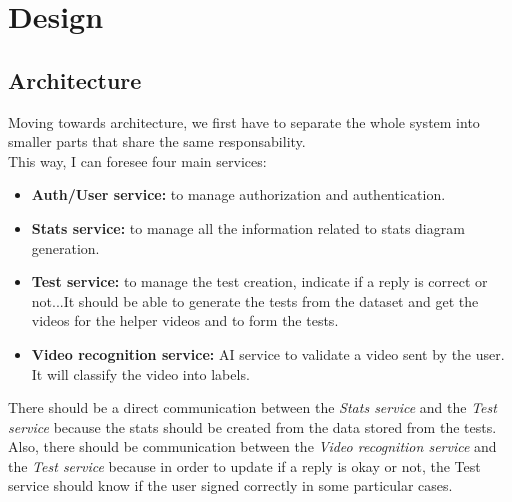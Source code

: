 \chapter{Design}

\section{Architecture}
Moving towards architecture, we first have to separate the whole system into smaller parts that share the same responsability. \\
This way, I can foresee four main services:
\begin{itemize}
    \item \textbf{Auth/User service:} to manage authorization and authentication.
    \item \textbf{Stats service:} to manage all the information related to stats diagram generation. 
    \item \textbf{Test service:} to manage the test creation, indicate if a reply is correct or not...It should be able to generate the tests from the dataset and get the videos for the helper videos and to form the tests.
    \item \textbf{Video recognition service:} AI service to validate a video sent by the user. It will classify the video into labels.
\end{itemize}

There should be a direct communication between the \textit{Stats service} and the \textit{Test service} because the stats should be created from the data stored from the tests. \\
Also, there should be communication between the \textit{Video recognition service} and the \textit{Test service} because in order to update if a reply is okay or not, the {Test service} should know if the user signed correctly in some particular cases.


